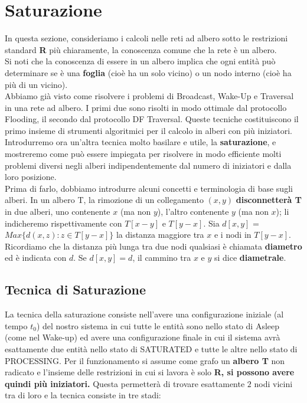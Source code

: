 \chapter{Saturazione}\label{cap:saturazione}

In questa sezione, consideriamo i
calcoli nelle reti ad albero sotto le restrizioni standard \textbf{R} più
chiaramente, la conoscenza comune che la rete è un albero.\\
Si noti che la conoscenza di essere in un albero implica che ogni entità può
determinare se è una \textbf{foglia} (cioè ha un solo vicino) o un nodo interno
(cioè ha più di un vicino).\\
Abbiamo già visto come risolvere i problemi di Broadcast, Wake-Up e Traversal in
una rete ad albero. I primi due sono risolti in modo ottimale dal protocollo
Flooding, il secondo dal protocollo DF Traversal. Queste tecniche costituiscono
il primo insieme di strumenti algoritmici per il calcolo in alberi con più
iniziatori. Introdurremo ora un'altra tecnica molto basilare e utile, la
\textbf{saturazione}, e mostreremo come può essere impiegata per risolvere in
modo efficiente molti problemi diversi negli alberi indipendentemente dal numero
di iniziatori e dalla loro posizione.\\
Prima di farlo, dobbiamo introdurre alcuni concetti e terminologia di base sugli
alberi. In un albero T, la rimozione di un collegamento $(x,y)$
\textbf{disconnetterà T} in due alberi, uno contenente $x$ (ma non $y$), l'altro
contenente $y$ (ma non $x$); li indicheremo rispettivamente con $T[x - y]$ e
$T[y - x]$. Sia $d[x, y]$ = $Max\{d(x, z) : z \in T[y - x]\}$ la distanza
maggiore tra $x$ e i nodi in $T[y - x]$. Ricordiamo che la distanza più lunga
tra due nodi qualsiasi è chiamata \textbf{diametro} ed è indicata con $d$. Se
$d[x, y] = d$, il cammino tra $x$ e $y$ si dice \textbf{diametrale}.

\section{Tecnica di Saturazione}
La tecnica della saturazione consiste nell'avere una configurazione iniziale (al
tempo $t_0$) del nostro sistema in cui tutte le entità sono nello stato di
Asleep (come nel Wake-up) ed avere una configurazione finale in cui il sistema
avrà esattamente due entità nello stato di SATURATED e tutte le altre nello
stato di PROCESSING. Per il funzionamento si assume come grafo un \textbf{albero
    T} non radicato e l'insieme delle restrizioni in cui si lavora è solo \textbf{R,
    si possono avere quindi più iniziatori.} Questa permetterà di trovare
esattamente $2$ nodi vicini tra di loro e la tecnica consiste in tre stadi:

